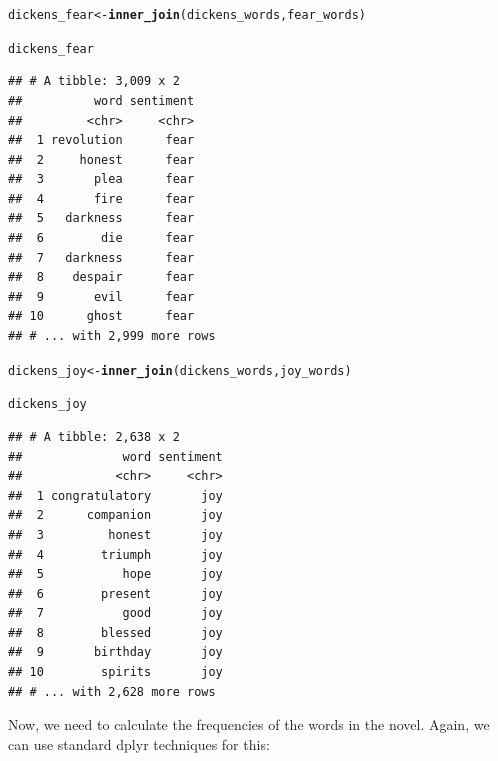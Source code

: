 \documentclass{article}\usepackage[]{graphicx}\usepackage[]{color}
\makeatletter
\newcommand{\hlstd}[1]{\textcolor[rgb]{0.345,0.345,0.345}{#1}}%
\newcommand{\hlkwb}[1]{\textcolor[rgb]{0.69,0.353,0.396}{#1}}%
\newcommand{\hlkwd}[1]{\textcolor[rgb]{0.737,0.353,0.396}{\textbf{#1}}}%
\newenvironment{kframe}{%
 \def\at@end@of@kframe{}%
 \ifinner\ifhmode%
  \def\at@end@of@kframe{\end{minipage}}%
  \begin{minipage}{\columnwidth}%
 \fi\fi%
 \def\FrameCommand##1{\hskip\@totalleftmargin \hskip-\fboxsep
 \colorbox{shadecolor}{##1}\hskip-\fboxsep
     \hskip-\linewidth \hskip-\@totalleftmargin \hskip\columnwidth}%
 \MakeFramed {\advance\hsize-\width
   \@totalleftmargin\z@ \linewidth\hsize
   \@setminipage}}%
 {\par\unskip\endMakeFramed%
 \at@end@of@kframe}
\newenvironment{knitrout}{}{} %
\makeatother
\begin{document}
\begin{knitrout}
\color{fgcolor}\begin{kframe}
\begin{alltt}
\hlstd{dickens_fear}\hlkwb{<-}\hlkwd{inner_join}\hlstd{(dickens_words,fear_words)}
\end{alltt}


{\ttfamily\noindent\itshape{}}\begin{alltt}
\hlstd{dickens_fear}
\end{alltt}
\begin{verbatim}
## # A tibble: 3,009 x 2
##          word sentiment
##         <chr>     <chr>
##  1 revolution      fear
##  2     honest      fear
##  3       plea      fear
##  4       fire      fear
##  5   darkness      fear
##  6        die      fear
##  7   darkness      fear
##  8    despair      fear
##  9       evil      fear
## 10      ghost      fear
## # ... with 2,999 more rows
\end{verbatim}
\begin{alltt}
\hlstd{dickens_joy}\hlkwb{<-}\hlkwd{inner_join}\hlstd{(dickens_words,joy_words)}
\end{alltt}


{\ttfamily\noindent\itshape{}}\begin{alltt}
\hlstd{dickens_joy}
\end{alltt}
\begin{verbatim}
## # A tibble: 2,638 x 2
##              word sentiment
##             <chr>     <chr>
##  1 congratulatory       joy
##  2      companion       joy
##  3         honest       joy
##  4        triumph       joy
##  5           hope       joy
##  6        present       joy
##  7           good       joy
##  8        blessed       joy
##  9       birthday       joy
## 10        spirits       joy
## # ... with 2,628 more rows
\end{verbatim}
\end{kframe}
\end{knitrout}

Now, we need to calculate the frequencies of the words in the novel.  Again, we can use standard dplyr techniques for this:
\end{document}

